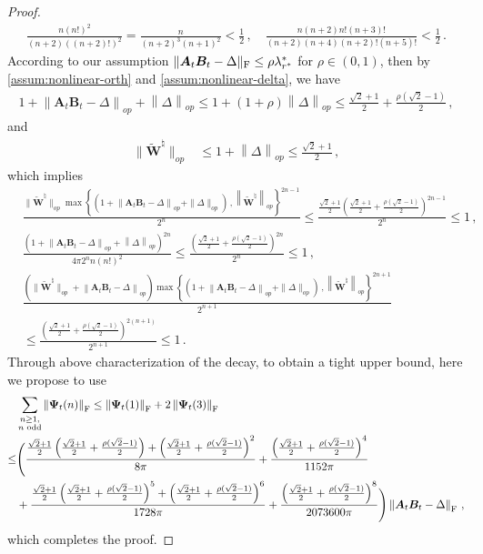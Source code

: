 \begin{proof}
\begin{align*}
    \frac{n (n!)^2}{(n+2) ((n+2)!)^2}=\frac{n}{(n+2)^3(n+1)^2}<\frac{1}{2}\,,\quad\frac{n(n + 2)n!(n+3)!}{(n+2)(n + 4)(n+2)!(n+5)!}<\frac{1}{2}\,.
\end{align*}
According to our assumption $\|\bm A_t \bm B_t - \Delta\|_{\rm F}\leq \rho \lambda^*_{r^*}$ for $\rho \in (0,1)$, then by \cref{assum:nonlinear-orth} and \cref{assum:nonlinear-delta}, we have
\begin{align*}
    1+\left\|\bm A_{t}\bm B_t - \Delta\right\|_{op}+\left\|\Delta\right\|_{op}\leq 1+(1+\rho)\left\|\Delta\right\|_{op}\leq \frac{\sqrt{2}+1}{2}+\frac{\rho(\sqrt{2}-1)}{2}\,,
\end{align*}
and
\begin{align*}
    \|\widetilde{\bm W}^\natural\|_{op} & \leq 1 + \left\|\Delta\right\|_{op} \leq \frac{\sqrt{2}+1}{2}\,,
\end{align*}
which implies
\begin{align*}
    &\frac{\|\widetilde{\bm W}^\natural\|_{op}\max\left\{\left(1 + \left\|\bm A_t \bm B_t - \Delta\right\|_{op} + \|\Delta\|_{op}\right)\,,\left\|\widetilde{\bm W}^\natural\right\|_{op}\right\}^{2n-1}}{2^{n}}\leq \frac{\frac{\sqrt{2}+1}{2}\left(\frac{\sqrt{2}+1}{2}+\frac{\rho(\sqrt{2}-1)}{2}\right)^{2n-1}}{2^{n}}\leq 1\,,\\
    &\frac{\left(1+\left\|\bm A_{t}\bm B_t - \Delta\right\|_{op}+\left\|\Delta\right\|_{op}\right)^{2n}}{4\pi 2^{n} n (n!)^2}\leq \frac{\left(\frac{\sqrt{2}+1}{2}+\frac{\rho(\sqrt{2}-1)}{2}\right)^{2n}}{2^{n}}\leq 1\,,\\
    &\frac{\left(\|\widetilde{\bm W}^\natural\|_{op}+\left\|\bm A_{t}\bm B_t - \Delta\right\|_{op}\right)\max\left\{\left(1 + \left\|\bm A_t \bm B_t - \Delta\right\|_{op} + \|\Delta\|_{op}\right)\,,\left\|\widetilde{\bm W}^\natural\right\|_{op}\right\}^{2n+1}}{2^{n+1}}\\&\leq \frac{\left(\frac{\sqrt{2}+1}{2}+\frac{\rho(\sqrt{2}-1)}{2}\right)^{2(n+1)}}{2^{n+1}}\leq 1\,.
\end{align*}
Through above characterization of the decay, to obtain a tight upper bound, here we propose to use
\begin{align*}
    & \sum_{\substack{n\geq 1,\\n\text{ odd}}}\left\|\bm \Psi_t(n)\right\|_{\rm F}
    \leq \left\|\bm \Psi_t(1)\right\|_{\rm F}+2\left\|\bm \Psi_t(3)\right\|_{\rm F}\\
    \leq & \Bigg(\frac{\frac{\sqrt{2}+1}{2}\left(\frac{\sqrt{2}+1}{2}+\frac{\rho(\sqrt{2}-1)}{2}\right)+\left(\frac{\sqrt{2}+1}{2}+\frac{\rho(\sqrt{2}-1)}{2}\right)^2}{8\pi}+\frac{\left(\frac{\sqrt{2}+1}{2}+\frac{\rho(\sqrt{2}-1)}{2}\right)^4}{1152\pi}\\
    & + \frac{\frac{\sqrt{2}+1}{2}\left(\frac{\sqrt{2}+1}{2}+\frac{\rho(\sqrt{2}-1)}{2}\right)^5+\left(\frac{\sqrt{2}+1}{2}+\frac{\rho(\sqrt{2}-1)}{2}\right)^6}{1728\pi}+\frac{\left(\frac{\sqrt{2}+1}{2}+\frac{\rho(\sqrt{2}-1)}{2}\right)^{8}}{2073600\pi}\Bigg)\left\|\bm A_t \bm B_t - \Delta\right\|_{\rm F}\,,
\end{align*}
which completes the proof.
\end{proof}
